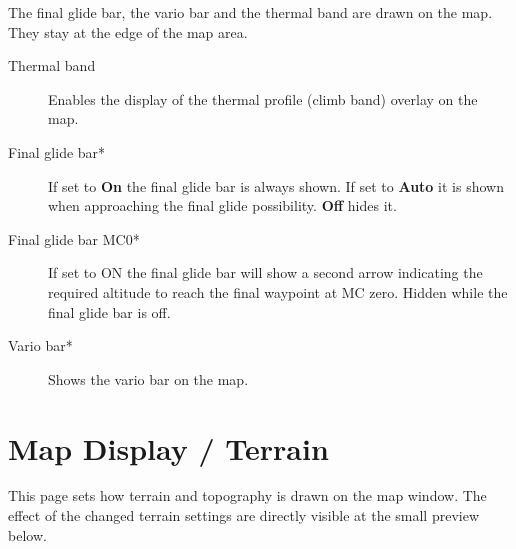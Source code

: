 The final glide bar, the vario bar and the thermal band are drawn on
the map. They stay at the edge of the map area.

\begin{description}
\item[Thermal band] \label{conf:thermalband} Enables the display of the
  thermal profile (climb band) overlay on the map.
\item[Final glide bar*]  If set to {\bf On} the final glide bar is always
  shown. If set to {\bf Auto} it is shown when approaching the final glide
  possibility. {\bf Off} hides it.
\item[Final glide bar MC0*]  If set to ON the final glide bar will show a second arrow
  indicating the required altitude to reach the final waypoint at MC zero.
  Hidden while the final glide bar is off.
\item[Vario bar*]  Shows the vario bar on the map.
\end{description}


\section{Map Display / Terrain}\label{sec:terrain-display}

This page sets how terrain and topography is drawn on the map window. The effect of the 
changed terrain settings are directly visible at the small preview below.

